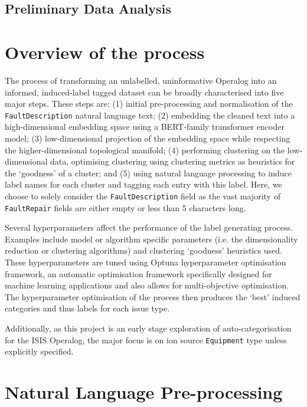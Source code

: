 \documentclass[10pt,oneside]{report}
\begin{document}
\subsection{Preliminary Data Analysis}


\section{Overview of the process}

The process of transforming an unlabelled, uninformative Operalog into an informed, induced-label tagged dataset can be broadly characterised into five major steps. These steps are: (1) initial pre-processing and normalisation of the \texttt{FaultDescription} natural language text; (2) embedding the cleaned text into a high-dimensional embedding space using a BERT-family transformer encoder model; (3) low-dimensional projection of the embedding space while respecting the higher-dimensional topological manifold; (4) performing clustering on the low-dimensional data, optimising clustering using clustering metrics as heuristics for the `goodness' of a cluster; and (5) using natural language processing to induce label names for each cluster and tagging each entry with this label. Here, we choose to solely consider the \texttt{FaultDescription} field as the vast majority of \texttt{FaultRepair} fields are either empty or less than 5 characters long.

Several hyperparameters affect the performance of the label generating process. Examples include model or algorithm specific parameters (i.e. the dimensionality reduction or clustering algorithms) and clustering `goodness' heuristics used. These hyperparameters are tuned using Optuna hyperparameter optimisation framework, an automatic optimisation framework specifically designed for machine learning applications \cite{akiba2019optuna} and also allows for multi-objective optimisation. The hyperparameter optimisation of the process then produces the `best' induced categories and thus labels for each issue type. 

Additionally, as this project is an early stage exploration of auto-categorisation for the ISIS Operalog, the major focus is on ion source \texttt{Equipment} type unless explicitly specified.


\section{Natural Language Pre-processing}
\end{document}
